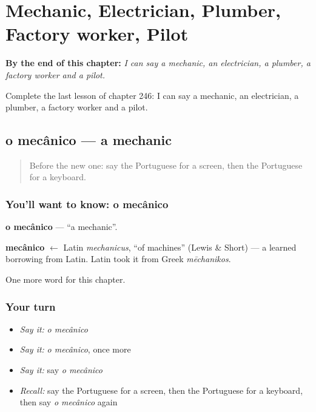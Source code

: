 
\chapter{Mechanic, Electrician, Plumber, Factory worker, Pilot}
\label{ch:pt-mechanic-electrician-plumber-factory-worker-pilot}

\begin{chapteropening}
\textbf{By the end of this chapter:} \emph{I can say a mechanic, an electrician, a plumber, a factory worker and a pilot.}

Complete the last lesson of chapter 246: I can say a mechanic, an electrician, a plumber, a factory worker and a pilot.
\end{chapteropening}

\section[o mecânico]{o mecânico — a mechanic}

\label{lesson:PT-C246-mecanico}



\begin{quote}
Before the new one: say the Portuguese for a screen, then the Portuguese for a keyboard.
\end{quote}

\subsection*{You'll want to know: o mecânico}
\textbf{o mecânico} — \textquotedblleft{}a mechanic\textquotedblright{}.

\begin{cousinweb}
\textbf{mecânico} $\leftarrow$ Latin \emph{mechanicus}, \textquotedblleft{}of machines\textquotedblright{} (Lewis \& Short) — a learned borrowing from Latin. Latin took it from Greek \emph{mēchanikos}.
\end{cousinweb}

\begin{grammarlens}[title={What you've built}]
One more word for this chapter.
\end{grammarlens}

\subsection*{Your turn}
\begin{itemize}
\raggedright
  \item \emph{Say it:} \emph{o mecânico}
  \item \emph{Say it:} \emph{o mecânico}, once more
  \item \emph{Say it:} say \emph{o mecânico}
  \item \emph{Recall:} say the Portuguese for a screen, then the Portuguese for a keyboard, then say \emph{o mecânico} again
\end{itemize}

